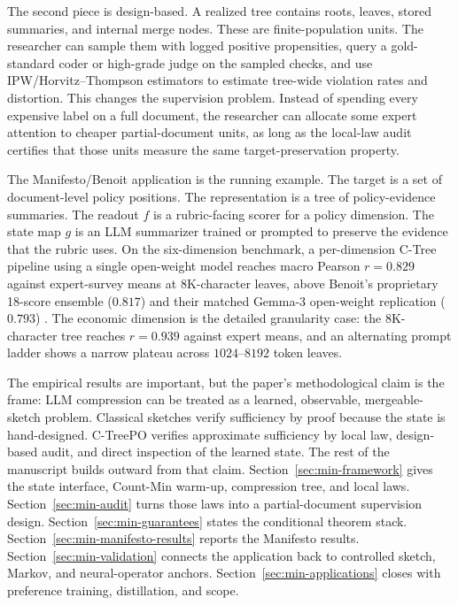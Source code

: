 The second piece is design-based. A realized tree contains roots, leaves,
stored summaries, and internal merge nodes. These are finite-population units.
The researcher can sample them with logged positive propensities, query a
gold-standard coder or high-grade judge on the sampled checks, and use
IPW/Horvitz--Thompson estimators to estimate tree-wide violation rates and
distortion. This changes the supervision problem. Instead of spending every
expensive label on a full document, the researcher can allocate some expert
attention to cheaper partial-document units, as long as the local-law audit
certifies that those units measure the same target-preservation property.

The Manifesto/Benoit application is the running example. The target is a set
of document-level policy positions. The representation is a tree of
policy-evidence summaries. The readout $f$ is a rubric-facing scorer for a
policy dimension. The state map $g$ is an LLM summarizer trained or prompted
to preserve the evidence that the rubric uses. On the six-dimension benchmark,
a per-dimension C-Tree pipeline using a single open-weight model reaches macro
Pearson $r=0.829$ against expert-survey means at $8\mathrm{K}$-character
leaves, above Benoit's proprietary 18-score ensemble ($0.817$) and their
matched Gemma-3 open-weight replication ($0.793$)
\citep{BenoitEtAl2025,ManifestoProject2025a}. The economic dimension is the
detailed granularity case: the $8\mathrm{K}$-character tree reaches
$r=0.939$ against expert means, and an alternating prompt ladder shows a
narrow plateau across $1024$--$8192$ token leaves.

The empirical results are important, but the paper's methodological claim is
the frame: LLM compression can be treated as a learned, observable,
mergeable-sketch problem. Classical sketches verify sufficiency by proof
because the state is hand-designed. C-TreePO verifies approximate sufficiency
by local law, design-based audit, and direct inspection of the learned state.
The rest of the manuscript builds outward from that claim.
Section~\ref{sec:min-framework} gives the state interface, Count-Min warm-up,
compression tree, and local laws. Section~\ref{sec:min-audit} turns those laws
into a partial-document supervision design. Section~\ref{sec:min-guarantees}
states the conditional theorem stack. Section~\ref{sec:min-manifesto-results}
reports the Manifesto results. Section~\ref{sec:min-validation} connects the
application back to controlled sketch, Markov, and neural-operator anchors.
Section~\ref{sec:min-applications} closes with preference training,
distillation, and scope.
